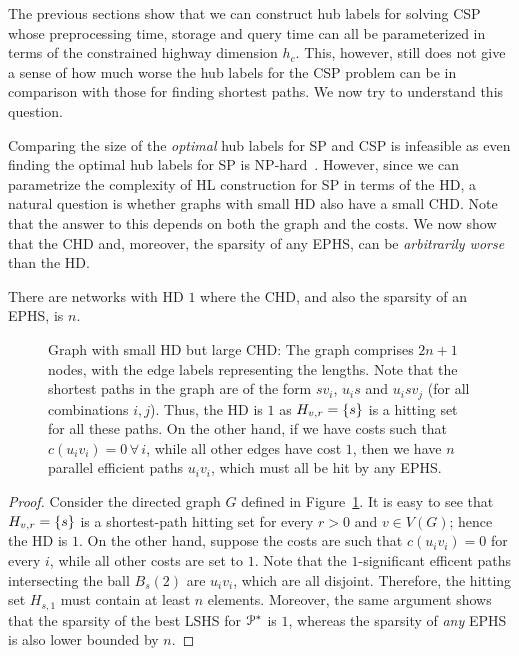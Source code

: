 The previous sections show that we can construct hub labels for solving CSP whose preprocessing time, storage and query time can all be parameterized in terms of the constrained highway dimension $h_c$. 
This, however, still does not give a sense of how much worse the hub labels for the CSP problem can be in comparison with those for finding shortest paths. 
We now try to understand this question.

Comparing the size of the \emph{optimal} hub labels for SP and CSP is infeasible as even finding the optimal hub labels for SP is NP-hard~\cite{babenko_hl_complexity}. However, since we can parametrize the complexity of HL construction for SP in terms of the HD, a natural question is whether graphs with small HD also have a small CHD. Note that the answer to this depends on both the graph and the costs.
We now show that the CHD and, moreover, the sparsity of any EPHS, can be \emph{arbitrarily worse} than the HD. 
\begin{proposition}
There are networks with HD $1$ where the CHD, and also the sparsity of an EPHS, is $n$.
\end{proposition}

\begin{figure}

\caption{Graph with small HD but large CHD: The graph comprises $2n+1$ nodes, with the edge labels representing the lengths. Note that the shortest paths in the graph are of the form $sv_i$, $u_is$ and $u_isv_j$ (for all combinations $i,j$). Thus, the HD is $1$ as $H_{v,r}=\{s\}$ is a hitting set for all these paths. On the other hand, if we have costs such that $c(u_iv_i)=0\,\forall\,i$, while all other edges have cost $1$, then we have $n$ parallel efficient paths $u_iv_i$, which must all be hit by any EPHS.}
\label{fig:big_chd}
\end{figure}

\begin{proof}
Consider the directed graph $G$ defined in Figure~\ref{fig:big_chd}.
It is easy to see that $H_{v,r}=\{s\}$ is a shortest-path hitting set for every $r>0$ and $v\in V(G)$; hence the HD is $1$.
On the other hand, suppose the costs are such that $c(u_iv_i)=0$ for every $i$, while all other costs are set to $1$.
Note that the $1$-significant efficent paths intersecting the ball $B_s(2)$ are $u_iv_i$, which are all disjoint.
Therefore, the hitting set $H_{s,1}$ must contain at least $n$ elements. Moreover, the same argument shows that the sparsity of the best LSHS for $\mathcal{P}^*$ is $1$, whereas the sparsity of \emph{any} EPHS is also lower bounded by $n$.
\end{proof}

